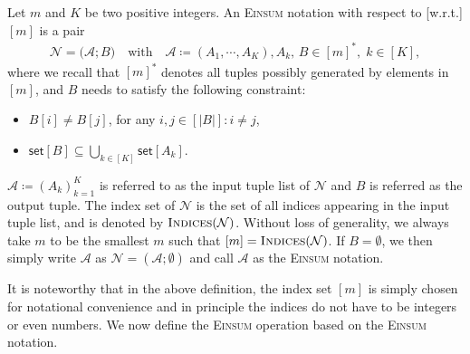 \documentclass[twoside,11pt]{article}
\def\Einsum{\textsc{Einsum}}
\newcommand{\takesetp}[1]{\mathsf{set}[#1]}
\newcommand{\indexset}{\textsc{Indices}}
\def\calN{\mathcal{N}}
\def\calA{\mathcal{A}}
\begin{document}
\begin{definition}[{\normalfont\Einsum{}} Notation]\label{def:tensor_expression}
Let $m$ and $K$ be two positive integers. An \Einsum{} notation with respect to [w.r.t.] $[m]$ is a pair
\begin{align*}
\calN = \big(\calA; B\big) \quad \text{with} \quad \calA \coloneqq (A_1, \cdots, A_K), A_k,\, B \in [m]^*, \; k \in [K],
\end{align*}
where we recall that $[m]^{\ast}$ denotes all tuples possibly generated by elements in $[m]$, and $B$ needs to satisfy the following constraint: 

\begin{itemize}
    \item $B[i] \neq B[j]$, for any $i, j \in [|B|]:i \neq j$, 
    \item $\takesetp{B} \subseteq \bigcup_{k \in [K]} \takesetp{A_k}$.
\end{itemize}
$\calA \coloneqq (A_k)_{k = 1}^{K}$ is referred to as the input tuple list of $\calN$ and $B$ is referred as the output tuple. The index set of $\calN$ is the set of all indices appearing in the input tuple list, and is denoted by $\indexset(\calN)$. Without loss of generality, we always take $m$ to be the smallest $m$ such that $[m] = \indexset(\calN)$. If $B = \emptyset$, we then simply write $\calA$ as $\calN = (\calA; \emptyset)$ and call $\calA$ as the \Einsum{} notation.
\end{definition}


It is noteworthy that in the above definition, the index set $[m]$ is simply chosen for notational convenience and in principle the indices do not have to be integers or even numbers. We now define the \Einsum{} operation based on the \Einsum{} notation.
\end{document}
